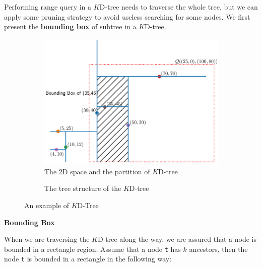 Performing range query in a $K$D-tree needs to traverse the whole tree, but we can apply some pruning strategy to avoid useless searching for some nodes. We first present the \textbf{bounding box} of subtree in a $K$D-tree.

\begin{figure}[!htb]
     \centering
     \begin{subfigure}[b]{0.58\textwidth}
         \centering
         \includegraphics[width=\textwidth]{graphs/implementation/queries/range_query_kdtree}
         \caption{The $2$D space and the partition of $K$D-tree}
     \end{subfigure}
     \hfill
     \begin{subfigure}[b]{0.40\textwidth}
         \centering
         
         \caption{The tree structure of the $K$D-tree}
     \end{subfigure}
        \caption{An example of $K$D-Tree}
        \label{fig:kdtree-rangequery}
\end{figure}

\noindent
\textbf{Bounding Box}

\noindent
When we are traversing the $K$D-tree along the way, we are assured that a node is bounded in a rectangle region. Assume that a node \texttt{t} has $k$ ancestors, then the node \texttt{t} is bounded in a rectangle in the following way: 


